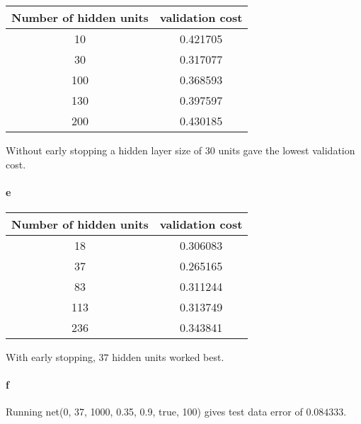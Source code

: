 \documentclass{article}
\begin{document}
\begin{tabular}{c | c}
  Number of hidden units & validation cost\\
  \hline
  10 & 0.421705\\
  \hline
  30 & 0.317077\\
  \hline
  100 & 0.368593\\
  \hline
  130 & 0.397597\\
  \hline
  200 & 0.430185\\
\end{tabular}

Without early stopping a hidden layer size of $30$ units gave the lowest
validation cost.

\paragraph{e}

\begin{tabular}{c | c}
  Number of hidden units & validation cost\\
  \hline
  18 & 0.306083\\
  \hline
  37 & 0.265165\\
  \hline
  83 & 0.311244\\
  \hline
  113 & 0.313749\\
  \hline
  236 & 0.343841\\
\end{tabular}

With early stopping, $37$ hidden units worked best.

\paragraph{f}

Running net(0, 37, 1000, 0.35, 0.9, true, 100) gives test data error of
$0.084333$.
\end{document}
